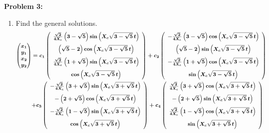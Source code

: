 \documentclass[11pt]{article}
\newcommand{\spacer}{\noalign{\medskip}}
\newenvironment{problem}[1]{\textbf{Problem #1: }}{\newpage}
\begin{document}
\begin{problem}{3}
\begin{enumerate}[label = (\alph*)]
			\newpage
			\item  Find the general solutions.
			\begin{align*}
				\boldsymbol{\begin{pmatrix}
					x_1 \\ y_1 \\ x_2 \\ y_2
				\end{pmatrix}} &\boldsymbol{= c_1\left(\begin{array}{c}
					\frac{\sqrt{2}}{4X_c}\left(3 - \sqrt{5}\right)\sin\left(X_c\sqrt{3 - \sqrt{5}}\,t\right)	\\
					\spacer \left(\sqrt{5} - 2\right)\cos\left(X_c\sqrt{3 - \sqrt{5}}\,t\right) \\
					\spacer \frac{\sqrt{2}}{4X_c}\left(1 + \sqrt{5}\right)\sin\left(X_c\sqrt{3 - \sqrt{5}}\,t\right) \\
					\spacer \cos\left(X_c\sqrt{3 - \sqrt{5}}\,t\right)
				\end{array}\right) + c_2\left(\begin{array}{c}
					-\frac{\sqrt{2}}{4X_c}\left(3 - \sqrt{5}\right)\cos\left(X_c\sqrt{3 - \sqrt{5}}\,t\right)	\\
					\spacer \left(\sqrt{5} - 2\right)\sin\left(X_c\sqrt{3 - \sqrt{5}}\,t\right) \\
					\spacer -\frac{\sqrt{2}}{4X_c}\left(1 + \sqrt{5}\right)\cos\left(X_c\sqrt{3 - \sqrt{5}}\,t\right) \\
					\spacer \sin\left(X_c\sqrt{3 - \sqrt{5}}\,t\right)
				\end{array}\right)} \\
				&\boldsymbol{+ c_3\left(\begin{array}{c}
					-\frac{\sqrt{2}}{4X_c}\left(3 + \sqrt{5}\right)\sin\left(X_c\sqrt{3 + \sqrt{5}}\,t\right)	\\
					\spacer -\left(2 + \sqrt{5}\right)\cos\left(X_c\sqrt{3 + \sqrt{5}}\,t\right) \\
					\spacer -\frac{\sqrt{2}}{4X_c}\left(1 - \sqrt{5}\right)\sin\left(X_c\sqrt{3 + \sqrt{5}}\,t\right) \\
					\spacer \cos\left(X_c\sqrt{3 + \sqrt{5}}\,t\right)
				\end{array}\right) + c_4\left(\begin{array}{c}
					\frac{\sqrt{2}}{4X_c}\left(3 + \sqrt{5}\right)\cos\left(X_c\sqrt{3 + \sqrt{5}}\,t\right)	\\
					\spacer -\left(2 + \sqrt{5}\right)\sin\left(X_c\sqrt{3 + \sqrt{5}}\,t\right) \\
					\spacer \frac{\sqrt{2}}{4X_c}\left(1 - \sqrt{5}\right)\cos\left(X_c\sqrt{3 + \sqrt{5}}\,t\right) \\
					\spacer \sin\left(X_c\sqrt{3 + \sqrt{5}}\,t\right)
				\end{array}\right)}
			\end{align*}
			
		\end{enumerate}
	\end{problem}
\end{document}
